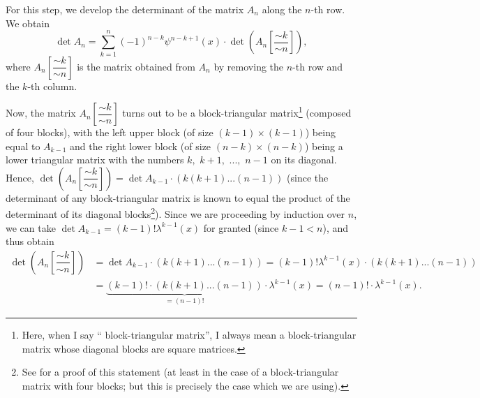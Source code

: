 \documentclass[numbers=enddot,12pt,final,onecolumn,notitlepage]{scrartcl}%
\begin{document}
For this step, we develop the determinant of the matrix $A_{n}$ along the
$n$-th row. We obtain%
\begin{equation}
\det A_{n}=\sum_{k=1}^{n}\left(  -1\right)  ^{n-k}\psi^{n-k+1}\left(
x\right)  \cdot\det\left(  A_{n}\left[  \dfrac{\sim k}{\sim n}\right]
\right)  , \label{9.ex3.s2}%
\end{equation}
where $A_{n}\left[  \dfrac{\sim k}{\sim n}\right]  $ is the matrix obtained
from $A_{n}$ by removing the $n$-th row and the $k$-th column.

Now, the matrix $A_{n}\left[  \dfrac{\sim k}{\sim n}\right]  $ turns out to be
a block-triangular matrix\footnote{Here, when I say \textquotedblleft
block-triangular matrix\textquotedblright, I always mean a block-triangular
matrix whose diagonal blocks are square matrices.} (composed of four blocks),
with the left upper block (of size $\left(  k-1\right)  \times\left(
k-1\right)  $) being equal to $A_{k-1}$ and the right lower block (of size
$\left(  n-k\right)  \times\left(  n-k\right)  $) being a lower triangular
matrix with the numbers $k,$ $k+1,$ $...,$ $n-1$ on its diagonal. Hence,
$\det\left(  A_{n}\left[  \dfrac{\sim k}{\sim n}\right]  \right)  =\det
A_{k-1}\cdot\left(  k\left(  k+1\right)  ...\left(  n-1\right)  \right)  $
(since the determinant of any block-triangular matrix is known to equal the
product of the determinant of its diagonal blocks\footnote{See \cite[Exercise
44]{Grin-detn} for a proof of this statement (at least in the case of a
block-triangular matrix with four blocks; but this is precisely the case which
we are using).}). Since we are proceeding by induction over $n$, we can take
$\det A_{k-1}=\left(  k-1\right)  !\lambda^{k-1}\left(  x\right)  $ for
granted (since $k-1<n$), and thus obtain%
\begin{align*}
\det\left(  A_{n}\left[  \dfrac{\sim k}{\sim n}\right]  \right)   &  =\det
A_{k-1}\cdot\left(  k\left(  k+1\right)  ...\left(  n-1\right)  \right)
=\left(  k-1\right)  !\lambda^{k-1}\left(  x\right)  \cdot\left(  k\left(
k+1\right)  ...\left(  n-1\right)  \right) \\
&  =\underbrace{\left(  k-1\right)  !\cdot\left(  k\left(  k+1\right)
...\left(  n-1\right)  \right)  }_{=\left(  n-1\right)  !}\cdot\lambda
^{k-1}\left(  x\right)  =\left(  n-1\right)  !\cdot\lambda^{k-1}\left(
x\right)  .
\end{align*}
\end{document}
